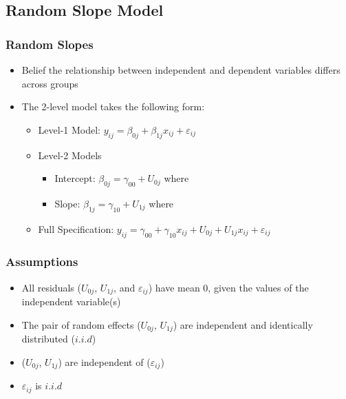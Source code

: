 \documentclass{beamer}
\begin{document}
\subsection{Random Slope Model}

\begin{frame}
	\frametitle{Random Slopes}
		\begin{itemize}
			\item Belief the relationship between independent and dependent variables differs across groups
			\item The 2-level model takes the following form:
				\begin{itemize}
					\item Level-1 Model: $y_{ij}=\beta_{0j}+\beta_{1j}x_{ij}+\varepsilon_{ij}$
					\item Level-2 Models
						\begin{itemize}
							\item Intercept: $\beta_{0j}=\gamma_{00}+U_{0j}$ where
							\item Slope: $\beta_{1j}=\gamma_{10}+U_{1j}$ where
						\end{itemize}
					\item Full Specification: $y_{ij}=\gamma_{00}+\gamma_{10}x_{ij}+U_{0j}+U_{1j}x_{ij}+\varepsilon_{ij}$
				\end{itemize}
		\end{itemize}
\end{frame}

\begin{frame}
	\frametitle{Assumptions}
		\begin{itemize}
			\item All residuals ($U_{0j}$, $U_{1j}$, and $\varepsilon_{ij}$) have mean $0$, given the values of the independent variable(s)
			\item The pair of random effects ($U_{0j}$, $U_{1j}$) are independent and identically distributed ($i.i.d$)
			\item ($U_{0j}$, $U_{1j}$) are independent of ($\varepsilon_{ij}$)
			\item $\varepsilon_{ij}$ is $i.i.d$
		\end{itemize}
\end{frame}
\end{document}
